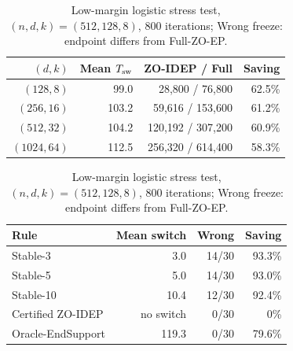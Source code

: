 \documentclass{article}
\begin{document}
\begin{table}[t]
\small
\centering
\begin{minipage}[t]{.49\textwidth}
\centering
\caption{Fixed-ratio scaling; every row certifies in 30/30 runs.}
\label{tab:scale}
\setlength{\tabcolsep}{2pt}%
\begin{tabular}{@{}rrrr@{}}
\toprule
$(d,k)$ & Mean $T_{\rm sw}$ & ZO-IDEP / Full & Saving\\
\midrule
$(128,8)$ & 99.0 & 28,800 / 76,800 & 62.5\%\\
$(256,16)$ & 103.2 & 59,616 / 153,600 & 61.2\%\\
$(512,32)$ & 104.2 & 120,192 / 307,200 & 60.9\%\\
$(1024,64)$ & 112.5 & 256,320 / 614,400 & 58.3\%\\
\bottomrule
\end{tabular}
\end{minipage}\hfill
\begin{minipage}[t]{.49\textwidth}
\centering
\caption{Low-margin logistic stress test, $(n,d,k)=(512,128,8)$, 800 iterations; Wrong freeze: endpoint differs from Full-ZO-EP.}
\label{tab:freeze}
\setlength{\tabcolsep}{2pt}%
\begin{tabular}{@{}lrrr@{}}
\toprule
Rule & Mean switch & Wrong & Saving\\
\midrule
Stable-3 & 3.0 & 14/30 & 93.3\%\\
Stable-5 & 5.0 & 14/30 & 93.0\%\\
Stable-10 & 10.4 & 12/30 & 92.4\%\\
Certified ZO-IDEP & no switch & 0/30 & 0\%\\
Oracle-EndSupport & 119.3 & 0/30 & 79.6\%\\
\bottomrule
\end{tabular}
\end{minipage}
\end{table}
\end{document}
